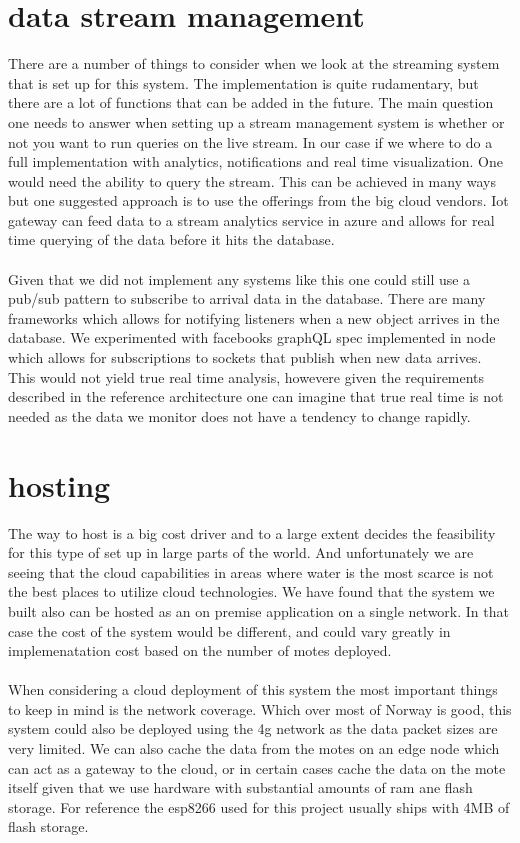 \documentclass[]{uiophd}
\begin{document}
\section{data stream management}
There are a number of things to consider when we look at the streaming system that is set up for this system. The implementation is quite rudamentary, but there are a lot of functions that can be added in the future. The main question one needs to answer when setting up a stream management system is whether or not you want to run queries on the live stream. In our case if we where to do a full implementation with analytics, notifications and real time visualization. One would need the ability to query the stream. This can be achieved in many ways but one suggested approach is to use the offerings from the big cloud vendors. Iot gateway can feed data to a stream analytics service in azure and allows for real time querying of the data before it hits the database.
\\\\
Given that we did not implement any systems like this one could still use a pub/sub pattern to subscribe to arrival data in the database. There are many frameworks which allows for notifying listeners when a new object arrives in the database. We experimented with facebooks graphQL spec implemented in node which allows for subscriptions to sockets that publish when new data arrives. This would not yield true real time analysis, howevere given the requirements described in the reference architecture one can imagine that true real time is not needed as the data we monitor does not have a tendency to change rapidly.
\section{hosting}
The way to host is a big cost driver and to a large extent decides the feasibility for this type of set up in large parts of the world. And unfortunately we are seeing that the cloud capabilities in areas where water is the most scarce is not the best places to utilize cloud technologies. We have found that the system we built also can be hosted as an on premise application on a single network. In that case the cost of the system would be different, and could vary greatly in implemenatation cost based on the number of motes deployed.
\\\\
When considering a cloud deployment of this system the most important things to keep in mind is the network coverage. Which over most of Norway is good, this system could also be deployed using the 4g network as the data packet sizes are very limited. We can also cache the data from the motes on an edge node which can act as a gateway to the cloud, or in certain cases cache the data on the mote itself given that we use hardware with substantial amounts of ram ane flash storage. For reference the esp8266 used for this project usually ships with 4MB of flash storage. 
\end{document}
